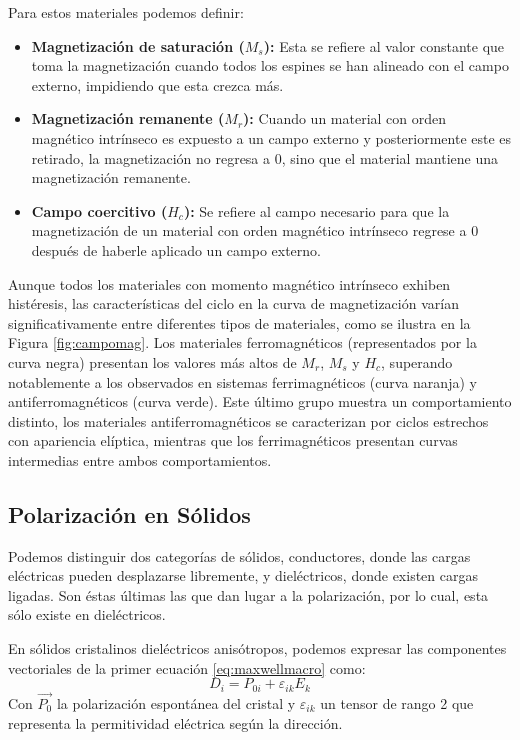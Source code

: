 \documentclass[../main.tex]{subfiles}
\begin{document}
Para estos materiales podemos definir:
\begin{itemize}
    \item \textbf{Magnetización de saturación ($M_s$):} Esta se refiere al valor constante que toma la magnetización cuando todos los espines se han alineado con el campo externo, impidiendo que esta crezca más.
    \item \textbf{Magnetización remanente ($M_r$):} Cuando un material con orden magnético intrínseco es expuesto a un campo externo y posteriormente este es retirado, la magnetización no regresa a 0, sino que el material mantiene una magnetización remanente.
    \item \textbf{Campo coercitivo ($H_c$):} Se refiere al campo necesario para que la magnetización de un material con orden magnético intrínseco regrese a 0 después de haberle aplicado un campo externo.
\end{itemize}
Aunque todos los materiales con momento magnético intrínseco exhiben histéresis, las características del ciclo en la curva de magnetización varían significativamente entre diferentes tipos de materiales, como se ilustra en la Figura \ref{fig:campomag}. Los materiales ferromagnéticos (representados por la curva negra) presentan los valores más altos de $M_r$, $M_s$ y $H_c$, superando notablemente a los observados en sistemas ferrimagnéticos (curva naranja) y antiferromagnéticos (curva verde). Este último grupo muestra un comportamiento distinto, los materiales antiferromagnéticos se caracterizan por ciclos estrechos con apariencia elíptica, mientras que los ferrimagnéticos presentan curvas intermedias entre ambos comportamientos.
\subsection{Polarización en Sólidos}
Podemos distinguir dos categorías de sólidos, conductores, donde las cargas eléctricas pueden desplazarse libremente, y dieléctricos, donde existen cargas ligadas. Son éstas últimas las que dan lugar a la polarización, por lo cual, esta sólo existe en dieléctricos.

En sólidos cristalinos dieléctricos anisótropos, podemos expresar las componentes vectoriales de la primer ecuación \ref{eq:maxwellmacro} como:
\begin{equation}
    D_i=P_{0i}+\varepsilon_{ik}E_k
    \label{eq:macroelec}
\end{equation}
Con $\vec{P_{0}}$ la polarización espontánea del cristal y $\varepsilon_{ik}$ un tensor de rango 2 que representa la permitividad eléctrica según la dirección.
\end{document}
